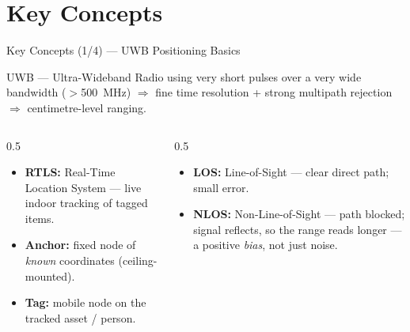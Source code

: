 \documentclass[aspectratio=169,10pt]{beamer}
\begin{document}
\section{Key Concepts}
\begin{frame}{Key Concepts (1/4) --- UWB Positioning Basics}
  \begin{block}{UWB --- Ultra-Wideband}
    Radio using very short pulses over a very wide bandwidth ($>$500~MHz) $\Rightarrow$
    fine time resolution + strong multipath rejection $\Rightarrow$ centimetre-level ranging.
  \end{block}
  \begin{columns}[T]
    \begin{column}{0.5\textwidth}
      \begin{itemize}\small
        \item \textbf{RTLS:} Real-Time Location System --- live indoor tracking of tagged items.
        \item \textbf{Anchor:} fixed node of \emph{known} coordinates (ceiling-mounted).
        \item \textbf{Tag:} mobile node on the tracked asset / person.
      \end{itemize}
    \end{column}
    \begin{column}{0.5\textwidth}
      \begin{itemize}\small
        \item \textbf{LOS:} Line-of-Sight --- clear direct path; small error.
        \item \textbf{NLOS:} Non-Line-of-Sight --- path blocked; signal reflects, so the range reads
              \alert{longer} --- a positive \emph{bias}, not just noise.
      \end{itemize}
    \end{column}
  \end{columns}
\end{frame}
\end{document}
